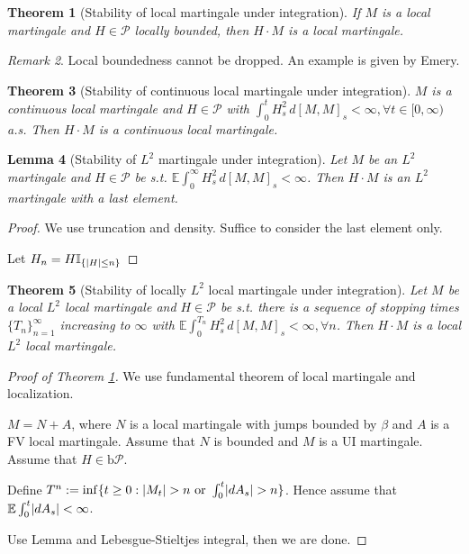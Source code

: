 \documentclass[openany,oneside]{book}
\newtheorem{thm}{Theorem}[section]
\newtheorem{lem}[thm]{Lemma}
\theoremstyle{definition}
\theoremstyle{remark}
\newtheorem{rem}[thm]{Remark}
\newcommand{\E}{\mathbb{E}} %
\newcommand{\I}{\mathbb{I}} %
\DeclarePairedDelimiter{\abs}{\lvert}{\rvert} %
\newcommand{\pred}{\mathcal{P}} %
\newcommand{\bP}{\mathrm{b}\pred} %
\begin{document}
\begin{thm}[Stability of local martingale under integration] \label{stab_loc_mg}
If $M$ is a local martingale and $H\in \pred$ locally bounded, then $H\cdot M$ is a local martingale.
\end{thm}
\begin{rem}
Local boundedness cannot be dropped. An example is given by Emery.
\end{rem}

\begin{thm}[Stability of continuous local martingale under integration]
$M$ is a continuous local martingale and $H\in \pred$ with $\int_0^t H^2_s \,d [M,M]_s < \infty, \forall t\in[0,\infty)$ a.s. Then $H\cdot M$ is a continuous local martingale.
\end{thm}

\begin{lem}[Stability of $L^2$ martingale under integration]
Let $M$ be an $L^2$ martingale and $H\in\pred$ be s.t. $\E\int_0^\infty H^2_s \,d [M,M]_s < \infty$. Then $H\cdot M$ is an $L^2$ martingale with a last element.
\end{lem}
\begin{proof}
We use truncation and density. Suffice to consider the last element only.
\par
Let $H_n = H \I_{\{\abs{H} \le n\}}$
\end{proof}

\begin{thm}[Stability of locally $L^2$ local martingale under integration]
Let $M$ be a local $L^2$ local martingale and $H\in\pred$ be s.t. there is a sequence of stopping times $\{T_n\}_{n=1}^\infty$ increasing to $\infty$ with $\E\int_0^{T_n} H^2_s \,d [M,M]_s < \infty, \forall n$. Then $H\cdot M$ is a local $L^2$ local martingale.
\end{thm}

\begin{proof}[Proof of Theorem \ref{stab_loc_mg}]
We use fundamental theorem of local martingale and localization.
\par
$M=N+A$, where $N$ is a local martingale with jumps bounded by $\beta$ and $A$ is a FV local martingale. Assume that $N$ is bounded and $M$ is a UI martingale. Assume that $H\in \bP$.
\par
Define $T^n:=\inf\{t\ge 0 : \abs{M_t} > n \textrm{ or } \int_0^t \abs{d A_s} > n \}$. Hence assume that $\E \int_0^t \abs{d A_s} < \infty$.
\par
Use Lemma and Lebesgue-Stieltjes integral, then we are done.
\end{proof}
\end{document}

